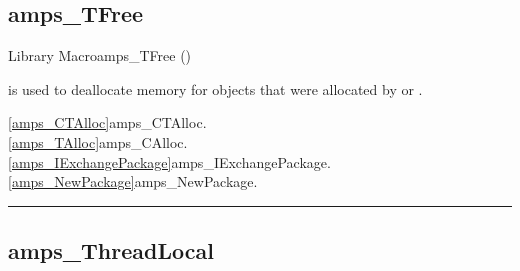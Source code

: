 \subsection{amps\_TFree}
\label{amps_TFree}


\begin{deftypefn}{Library Macro}{}{amps\_TFree}
()

\DESCRIPTION

 is used to deallocate memory for objects 
that were allocated by  or 
.

\SEEALSO
\vref{amps_CTAlloc}{amps\_CTAlloc}. \\
\vref{amps_TAlloc}{amps\_CAlloc}. \\
\vref{amps_IExchangePackage}{amps\_IExchangePackage}. \\
\vref{amps_NewPackage}{amps\_NewPackage}. \\

\end{deftypefn}


\noindent\rule{\textwidth}{1mm}

\subsection{amps\_ThreadLocal}
\label{amps_ThreadLocal}


